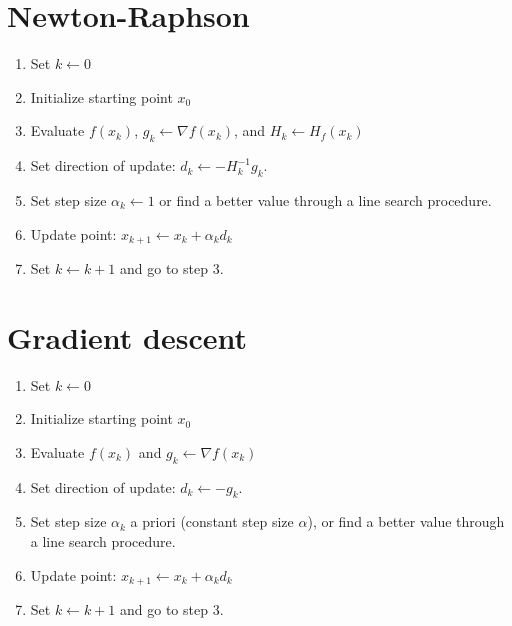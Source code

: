 \documentclass[12pt]{article}
\begin{document}
\section{Newton-Raphson}
\begin{enumerate}
	\item Set $k \leftarrow 0$
	\item Initialize starting point $x_0$
	\item Evaluate $f(x_k)$, $g_k \leftarrow \nabla f(x_k)$, and $H_k \leftarrow H_f(x_k)$
	\item Set direction of update: $d_{k} \leftarrow -H^{-1}_{k} g_k $.
	\item Set step size $\alpha_k \leftarrow 1$ or find a better value through a line search procedure.
	\item Update point: $x_{k+1} \leftarrow x_k + \alpha_k d_k$
	\item Set $k \leftarrow k + 1$ and go to step 3.
\end{enumerate}


\section{Gradient descent}
\begin{enumerate}
	\item Set $k \leftarrow 0$
	\item Initialize starting point $x_0$
	\item Evaluate $f(x_k)$ and $g_k \leftarrow \nabla f(x_k)$
	\item Set direction of update: $d_{k} \leftarrow -g_k $.
	\item Set step size $\alpha_k$ a priori (constant step size $\alpha$), or find a better value through a line search procedure.
	\item Update point: $x_{k+1} \leftarrow x_k + \alpha_k d_k$
	\item Set $k \leftarrow k + 1$ and go to step 3.
\end{enumerate}




\end{document}
